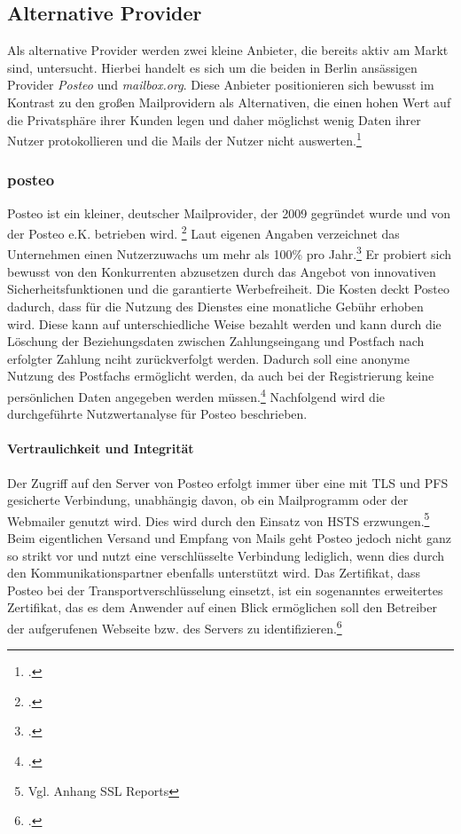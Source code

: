 \documentclass  [paper=a4,
				fontsize=12pt,
				listof=totoc,
				bibliography=totoc
				]{scrreprt}
\begin{document}
			\subsection{Alternative Provider}
			Als alternative Provider werden zwei kleine Anbieter, die bereits aktiv am Markt sind, untersucht.
			Hierbei handelt es sich um die beiden in Berlin ansässigen Provider \textit{Posteo} und \textit{mailbox.org}.
			Diese Anbieter positionieren sich bewusst im Kontrast zu den großen Mailprovidern als Alternativen, die einen hohen Wert auf die Privatsphäre ihrer Kunden legen und daher möglichst wenig Daten ihrer Nutzer protokollieren und die Mails der Nutzer nicht auswerten.\footcite[Vgl.][]{Posteo2013a, Mailbox2014}
			
				\subsubsection{posteo}
				\label{subsubsec:posteo}
					Posteo ist ein kleiner, deutscher Mailprovider, der 2009 gegründet wurde und von der Posteo e.K. betrieben wird. \footcite[Vgl.][]{Posteo2013b}
					Laut eigenen Angaben verzeichnet das Unternehmen einen Nutzerzuwachs um mehr als 100\% pro Jahr.\footcite[Vgl.][]{Posteo2013b}
					Er probiert sich bewusst von den Konkurrenten abzusetzen durch das Angebot von innovativen Sicherheitsfunktionen und die garantierte Werbefreiheit.
					Die Kosten deckt Posteo dadurch, dass für die Nutzung des Dienstes eine monatliche Gebühr erhoben wird.
					Diese kann auf unterschiedliche Weise bezahlt werden und kann durch die Löschung der Beziehungsdaten zwischen Zahlungseingang und Postfach nach erfolgter Zahlung nciht zurückverfolgt werden.
					Dadurch soll eine anonyme Nutzung des Postfachs ermöglicht werden, da auch bei der Registrierung keine persönlichen Daten angegeben werden müssen.\footcite[Vgl.][]{Posteo2013a}
					Nachfolgend wird die durchgeführte Nutzwertanalyse für Posteo beschrieben.
					\medskip\\
					
					\paragraph{Vertraulichkeit und Integrität}
						Der Zugriff auf den Server von Posteo erfolgt immer über eine mit \ac{TLS} und \ac{PFS} gesicherte Verbindung, unabhängig davon, ob ein Mailprogramm oder der Webmailer genutzt wird.
						Dies wird durch den Einsatz von \ac{HSTS} erzwungen.\footnote{Vgl. Anhang SSL Reports}
						Beim eigentlichen Versand und Empfang von Mails geht Posteo jedoch nicht ganz so strikt vor und nutzt eine verschlüsselte Verbindung lediglich, wenn dies durch den Kommunikationspartner ebenfalls unterstützt wird.
						Das Zertifikat, dass Posteo bei der Transportverschlüsselung einsetzt, ist ein sogenanntes erweitertes Zertifikat, das es dem Anwender auf einen Blick ermöglichen soll den Betreiber der aufgerufenen Webseite bzw. des Servers zu identifizieren.\footcite[Vgl.][]{Posteo2013c}\medskip\\
					
\end{document}
